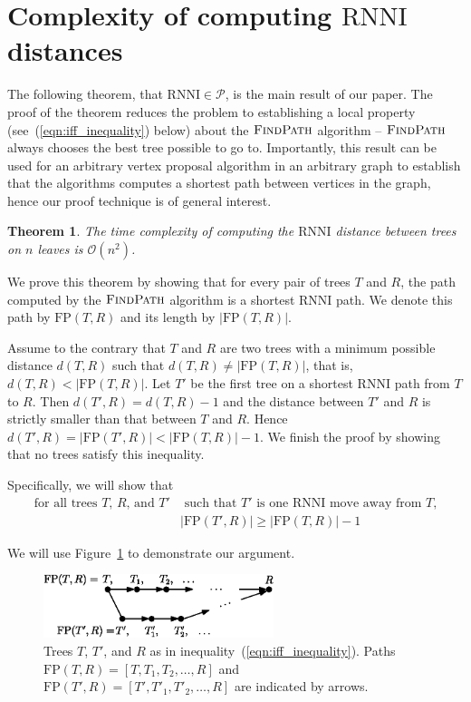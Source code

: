 \documentclass[11pt]{amsart}
\newtheorem{theorem}{Theorem}
\newcommand{\rnni}{\mathrm{RNNI}}
\newcommand{\findpath}{\textsc{FindPath}}
\newcommand{\fp}{\mathrm{FP}}
\newcommand{\p}{\mathcal{P}}
\renewcommand{\O}{\mathcal O}
\newcommand{\summary}[1]{} %
\begin{document}
\section{Complexity of computing $\rnni$ distances}

\summary{A few words about the main theorem and its proof.}
The following theorem, that $\rnni \in \p$, is the main result of our paper.
The proof of the theorem reduces the problem to establishing a local property (see~(\ref{eqn:iff_inequality}) below) about the $\findpath$ algorithm -- $\findpath$ always chooses the best tree possible to go to.
Importantly, this result can be used for an arbitrary vertex proposal algorithm in an arbitrary graph to establish that the algorithms computes a shortest path between vertices in the graph, hence our proof technique is of general interest.

\begin{theorem}
The time complexity of computing the $\rnni$ distance between trees on $n$ leaves is $\O(n^2)$.
\label{thm:rnni_polynomial}
\end{theorem}

\proof
We prove this theorem by showing that for every pair of trees $T$ and $R$, the path computed by the $\findpath$ algorithm is a shortest $\rnni$ path.
We denote this path by $\fp(T, R)$ and its length by $|\fp(T, R)|$.

Assume to the contrary that $T$ and $R$ are two trees with a minimum possible distance $d(T, R)$ such that $d(T,R) \neq |\fp(T,R)|$, that is, $d(T,R) < |\fp(T,R)|$.
Let $T'$ be the first tree on a shortest $\rnni$ path from $T$ to $R$.
Then $d(T',R) = d(T, R) - 1$ and the distance between $T'$ and $R$ is strictly smaller than that between $T$ and $R$.
Hence $d(T', R) = |\fp(T',R)| < |\fp(T,R)| - 1$.
We finish the proof by showing that no trees satisfy this inequality.

Specifically, we will show that
\begin{equation}
\begin{split}
\mbox{for all trees $T$, $R$, and $T'$}	& \mbox{ such that $T'$ is one $\rnni$ move away from $T$,}\\
					&|\fp(T',R)| \geq |\fp(T,R)| - 1
\end{split}
 \label{eqn:iff_inequality}
\end{equation}

We will use Figure~\ref{fig:proof_idea} to demonstrate our argument.

\begin{figure}[!hbt]
\centering
\includegraphics[width=0.6\textwidth]{proof_idea_ag}
\caption{Trees $T$, $T'$, and $R$ as in inequality~(\ref{eqn:iff_inequality}).
Paths $\fp(T,R) = [T,T_1,T_2, \ldots, R]$ and $\fp(T',R) = [T',T'_1,T'_2, \ldots, R]$ are indicated by arrows.}
\label{fig:proof_idea}
\end{figure}
\end{document}
